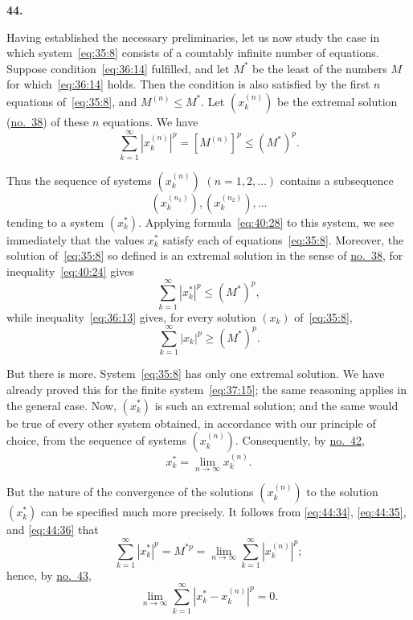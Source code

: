 \documentclass[
  paper=b5,
  fontsize=13pt,
  twoside=true,
  open=any,
  bookmarkpackage=false,
  chapterprefix=true,
  headings=normal
]{scrbook}
\theoremstyle{definition}
\newcommand{\numberedparagraph}[1]{%
  \par\medskip\phantomsection\label{sec:#1}%
  \noindent\textbf{#1.}\enspace
}
\begin{document}
\numberedparagraph{44}
Having established the necessary preliminaries, let us now study the case in which system~\eqref{eq:35:8} consists of a countably infinite number of equations. Suppose condition~\eqref{eq:36:14} fulfilled, and let $M^*$ be the least of the numbers $M$ for which~\eqref{eq:36:14} holds. Then the condition is also satisfied by the first $n$ equations of~\eqref{eq:35:8}, and $M^{(n)}\leq M^*$. Let $(x_k^{(n)})$ be the extremal solution (\hyperref[sec:38]{no.~38}) of these $n$ equations. We have
\begin{equation}
 \sum_{k=1}^{\infty}|x_k^{(n)}|^p
 =[M^{(n)}]^p\leq(M^*)^p.
 \tag{34}\label{eq:44:34}
\end{equation}

Thus the sequence of systems $(x_k^{(n)})$ $(n=1,2,\ldots)$ contains a subsequence
\[
 (x_k^{(n_1)}),(x_k^{(n_2)}),\ldots
\]
tending to a system $(x_k^*)$. Applying formula~\eqref{eq:40:28} to this system, we see immediately that the values $x_k^*$ satisfy each of equations~\eqref{eq:35:8}. Moreover, the solution of~\eqref{eq:35:8} so defined is an extremal solution in the sense of \hyperref[sec:38]{no.~38}, for inequality~\eqref{eq:40:24} gives
\[
 \sum_{k=1}^{\infty}|x_k^*|^p\leq(M^*)^p,
\]
while inequality~\eqref{eq:36:13} gives, for every solution $(x_k)$ of~\eqref{eq:35:8},
\begin{equation}
 \sum_{k=1}^{\infty}|x_k|^p\geq(M^*)^p.
 \tag{35}\label{eq:44:35}
\end{equation}

But there is more. System~\eqref{eq:35:8} has only one extremal solution. We have already proved this for the finite system~\eqref{eq:37:15};
the same reasoning applies in the general case. Now, $(x_k^*)$ is such an
extremal solution; and the same would be true of every other system obtained,
in accordance with our principle of choice, from the sequence of systems
$(x_k^{(n)})$. Consequently, by \hyperref[sec:42]{no.~42},
\begin{equation}
  x_k^*=\lim_{n\to\infty}x_k^{(n)}.
  \tag{36}\label{eq:44:36}
\end{equation}

But the nature of the convergence of the solutions $(x_k^{(n)})$ to the
solution $(x_k^*)$ can be specified much more precisely. It follows from
\eqref{eq:44:34}, \eqref{eq:44:35}, and \eqref{eq:44:36} that
\[
  \sum_{k=1}^{\infty}|x_k^*|^p=M^{*p}
  =\lim_{n\to\infty}\sum_{k=1}^{\infty}|x_k^{(n)}|^p;
\]
hence, by \hyperref[sec:43]{no.~43},
\[
  \lim_{n\to\infty}\sum_{k=1}^{\infty}|x_k^*-x_k^{(n)}|^p=0.
\]
\end{document}
